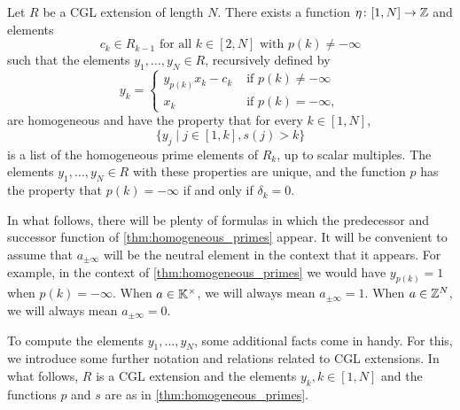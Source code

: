\begin{theorem}\label{thm:homogeneous_primes}
	Let $R$ be a CGL extension of length $N$. There exists a function $\eta \colon [1, N] \to \mathbb{Z}$ and elements
	\begin{equation*}
		c_k \in R_{k-1} \text{ for all } k \in [2,N] \text{ with } p(k) \neq - \infty
	\end{equation*}
	such that the elements $y_1, \dots, y_N \in R$, recursively defined by
	\begin{equation*}
		y_k = \begin{cases}
			y_{p(k)}x_k - c_k & \text{ if } p(k) \neq -\infty \\
			x_k               & \text{ if } p(k) = -\infty,
		\end{cases}
	\end{equation*}
	are homogeneous and have the property that for every $k \in [1, N]$,
	\begin{equation}\label{eq:list_of_ys_in_R_k}
		\{y_j \mid j \in [1, k], s(j) > k\}
	\end{equation}
	is a list of the homogeneous prime elements of $R_k$, up to scalar multiples. The
	elements $y_1, \dots, y_N \in R$ with these properties are unique, and the function $p$
	has the property that $p(k) = - \infty$ if and only if $\delta_k = 0$.
\end{theorem}

\begin{convention}

	In what follows, there will be plenty of formulas in which the predecessor and
	successor function of \cref{thm:homogeneous_primes} appear. It will be convenient to
	assume that $a_{\pm \infty}$ will be the neutral element in the context that it
	appears. For example, in the context of \cref{thm:homogeneous_primes} we would have
	$y_{p(k)} = 1$ when $p(k) = -\infty$. When $a \in \mathbb{K}^\times$, we will always mean
	$a_{\pm\infty} = 1$. When $a \in \mathbb{Z}^N$, we will always mean $a_{\pm\infty} = 0$.
\end{convention}

To compute the elements $y_1, \dots, y_N$, some additional facts come in handy. For
this, we introduce some further notation and relations related to CGL extensions. In
what follows, $R$ is a CGL extension and the elements $y_k, k \in [1, N]$ and the
functions $p$ and $s$ are as in \cref{thm:homogeneous_primes}.

